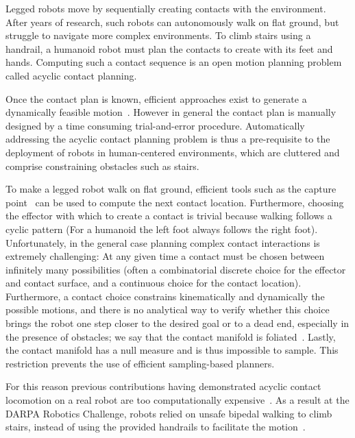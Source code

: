 \newcommand{\Pa}{$\mathcal{P}_1$ }
\newcommand{\Pb}{$\mathcal{P}_2$ }

Legged robots move by sequentially creating contacts with the environment.
After years of research, such robots can autonomously walk on flat ground, but struggle to navigate more complex environments.
To climb stairs using a handrail, a humanoid robot must plan the contacts to create with its feet and hands. Computing such a contact sequence is an open motion planning problem called acyclic contact planning.

Once the contact plan is known, efficient approaches exist to generate a dynamically feasible motion~\citep{Carpentier2016}. However in general
the contact plan is manually designed by a time consuming trial-and-error procedure. Automatically addressing the acyclic contact planning problem is thus a pre-requisite to the deployment of robots in human-centered environments, which are cluttered and comprise constraining obstacles such as stairs.

To make a legged robot walk on flat ground, efficient tools such as the capture point~\citep{Pratt2006} can be used to compute the next contact location. Furthermore, choosing the effector with which to create a contact is trivial because walking follows a cyclic pattern (For a humanoid the left foot always follows the right foot).
Unfortunately, in the general case planning complex contact interactions is extremely challenging:
At any given time a contact must be chosen between infinitely many possibilities (often a combinatorial discrete choice for the effector and contact surface, and a continuous choice for the contact location). Furthermore, a contact choice constrains kinematically and dynamically the possible motions, and there is no analytical way to verify whether this choice brings the robot one step closer to the desired goal or to a dead end, especially in the presence of obstacles; we say that the contact manifold is foliated~\citep{simeon-manipulation-04}. Lastly, the contact manifold has a null measure and is thus impossible to sample. This restriction prevents the use of efficient sampling-based planners.


For this reason previous contributions having demonstrated acyclic contact locomotion on a real robot are too computationally expensive~\citep{Bretl:2006:MPM:1124573.1124585}. As a result at the DARPA Robotics Challenge, robots relied on unsafe bipedal walking to climb stairs, instead of using the provided handrails to facilitate the motion~\citep{atkensondarpa}. 

